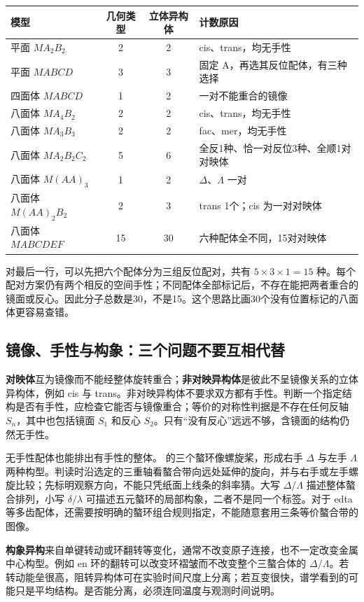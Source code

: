 \begin{center}
\small
\begin{tabularx}{\linewidth}{@{}l c c X@{}}
\toprule
模型 & 几何类型 & 立体异构体 & 计数原因 \\
\midrule
平面 $MA_2B_2$ & 2 & 2 & cis、trans，均无手性 \\
平面 $MABCD$ & 3 & 3 & 固定 A，再选其反位配体，有三种选择 \\
四面体 $MABCD$ & 1 & 2 & 一对不能重合的镜像 \\
八面体 $MA_4B_2$ & 2 & 2 & cis、trans，均无手性 \\
八面体 $MA_3B_3$ & 2 & 2 & fac、mer，均无手性 \\
八面体 $MA_2B_2C_2$ & 5 & 6 & 全反1种、恰一对反位3种、全顺1对对映体 \\
八面体 $M(AA)_3$ & 1 & 2 & $\Delta$、$\Lambda$ 一对 \\
八面体 $M(AA)_2B_2$ & 2 & 3 & trans 1个；cis 为一对对映体 \\
八面体 $MABCDEF$ & 15 & 30 & 六种配体全不同，15对对映体 \\
\bottomrule
\end{tabularx}
\end{center}

对最后一行，可以先把六个配体分为三组反位配对，共有 $5\times3\times1=15$ 种。每个配对方案仍有两个相反的空间手性；不同配体全部标记后，不存在能把两者重合的镜面或反心。因此分子总数是30，不是15。这个思路比画30个没有位置标记的八面体更容易查错。

\subsection{镜像、手性与构象：三个问题不要互相代替}
\textbf{对映体}互为镜像而不能经整体旋转重合；\textbf{非对映异构体}是彼此不呈镜像关系的立体异构体，例如 cis 与 trans。非对映异构体不要求双方都有手性。判断一个指定结构是否有手性，应检查它能否与镜像重合；等价的对称性判据是不存在任何反轴 $S_n$，其中也包括镜面 $S_1$ 和反心 $S_2$。只有“没有反心”远远不够，含镜面的结构仍然无手性。

无手性配体也能排出有手性的整体。 的三个螯环像螺旋桨，形成右手 $\Delta$ 与左手 $\Lambda$ 两种构型。判读时沿选定的三重轴看螯合带向远处延伸的旋向，并与右手或左手螺旋比较；先标明观察方向，不能只凭纸面上线条的斜率猜。大写 $\Delta/\Lambda$ 描述整体螯合排列，小写 $\delta/\lambda$ 可描述五元螯环的局部构象，二者不是同一个标签。对于 edta 等多齿配体，还需要按明确的螯环组合规则指定，不能随意套用三条等价螯合带的图像。

\textbf{构象异构}来自单键转动或环翻转等变化，通常不改变原子连接，也不一定改变金属中心构型。例如 en 环的翻转可以改变环褶皱而不改变整个三螯合体的 $\Delta/\Lambda$。若转动能垒很高，阻转异构体可在实验时间尺度上分离；若互变很快，谱学看到的可能只是平均结构。是否能分离，必须连同温度与观测时间说明。


